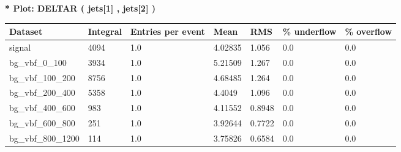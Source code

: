 \documentclass[a4paper, 10pt]{article}
\begin{document}
\textbf{* Plot: DELTAR ( jets[1] , jets[2] ) }\\
   \begin{table}[H]
  \begin{center}
    \begin{tabular}{|m{23.0mm}|m{23.0mm}|m{18.0mm}|m{19.0mm}|m{19.0mm}|m{19.0mm}|m{19.0mm}|}
      \hline
      {\cellcolor{yellow}         Dataset}& {\cellcolor{yellow}         Integral}& {\cellcolor{yellow}         Entries per event}& {\cellcolor{yellow}         Mean}& {\cellcolor{yellow}         RMS}& {\cellcolor{yellow}         \% underflow}& {\cellcolor{yellow}         \% overflow}\\
      \hline
      {\cellcolor{white}         signal}& {\cellcolor{white}         4094}& {\cellcolor{white}         1.0}& {\cellcolor{white}         4.02835}& {\cellcolor{white}         1.056}& {\cellcolor{green}         0.0}& {\cellcolor{green}         0.0}\\
      \hline
      {\cellcolor{white}         bg\_vbf\_0\_100}& {\cellcolor{white}         3934}& {\cellcolor{white}         1.0}& {\cellcolor{white}         5.21509}& {\cellcolor{white}         1.267}& {\cellcolor{green}         0.0}& {\cellcolor{green}         0.0}\\
      \hline
      {\cellcolor{white}         bg\_vbf\_100\_200}& {\cellcolor{white}         8756}& {\cellcolor{white}         1.0}& {\cellcolor{white}         4.68485}& {\cellcolor{white}         1.264}& {\cellcolor{green}         0.0}& {\cellcolor{green}         0.0}\\
      \hline
      {\cellcolor{white}         bg\_vbf\_200\_400}& {\cellcolor{white}         5358}& {\cellcolor{white}         1.0}& {\cellcolor{white}         4.4049}& {\cellcolor{white}         1.096}& {\cellcolor{green}         0.0}& {\cellcolor{green}         0.0}\\
      \hline
      {\cellcolor{white}         bg\_vbf\_400\_600}& {\cellcolor{white}         983}& {\cellcolor{white}         1.0}& {\cellcolor{white}         4.11552}& {\cellcolor{white}         0.8948}& {\cellcolor{green}         0.0}& {\cellcolor{green}         0.0}\\
      \hline
      {\cellcolor{white}         bg\_vbf\_600\_800}& {\cellcolor{white}         251}& {\cellcolor{white}         1.0}& {\cellcolor{white}         3.92644}& {\cellcolor{white}         0.7722}& {\cellcolor{green}         0.0}& {\cellcolor{green}         0.0}\\
      \hline
      {\cellcolor{white}         bg\_vbf\_800\_1200}& {\cellcolor{white}         114}& {\cellcolor{white}         1.0}& {\cellcolor{white}         3.75826}& {\cellcolor{white}         0.6584}& {\cellcolor{green}         0.0}& {\cellcolor{green}         0.0}\\

\end{tabular}
\end{center}
\end{table}
\end{document}
